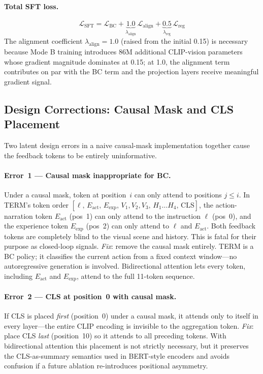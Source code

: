 \documentclass{article}
\begin{document}
\paragraph{Total SFT loss.}
\begin{equation}
  \mathcal{L}_{\mathrm{SFT}}
  = \mathcal{L}_{\mathrm{BC}}
  + \underbrace{1.0}_{\lambda_{\mathrm{align}}}\,\mathcal{L}_{\mathrm{align}}
  + \underbrace{0.5}_{\lambda_{\mathrm{reg}}}\,\mathcal{L}_{\mathrm{reg}}
  \label{eq:sft_loss}
\end{equation}
The alignment coefficient $\lambda_{\mathrm{align}}{=}1.0$ (raised from the
initial 0.15) is necessary because Mode B training introduces 86M additional
CLIP-vision parameters whose gradient magnitude dominates at 0.15; at 1.0,
the alignment term contributes on par with the BC term and the projection
layers receive meaningful gradient signal.

\subsection{Design Corrections: Causal Mask and CLS Placement}
\label{sec:bug}

Two latent design errors in a naive causal-mask implementation together
cause the feedback tokens to be entirely uninformative.

\paragraph{Error~1 — Causal mask inappropriate for BC.}
Under a causal mask, token at position~$i$ can only attend to
positions $j\!\le\!i$.
In TERM's token order
$[\ell,\,E_{\mathrm{act}},\,E_{\mathrm{exp}},\,V_1,V_2,V_3,\,H_1\ldots H_4,\,\mathrm{CLS}]$,
the action-narration token $E_{\mathrm{act}}$ (pos~1) can only attend to
the instruction $\ell$ (pos~0), and the experience token $E_{\mathrm{exp}}$
(pos~2) can only attend to $\ell$ and $E_{\mathrm{act}}$.
Both feedback tokens are completely blind to the visual scene and history.
This is fatal for their purpose as closed-loop signals.
\emph{Fix}: remove the causal mask entirely.
TERM is a BC policy; it classifies the current action from a fixed context
window---no autoregressive generation is involved.
Bidirectional attention lets every token, including $E_{\mathrm{act}}$ and
$E_{\mathrm{exp}}$, attend to the full 11-token sequence.

\paragraph{Error~2 — CLS at position~0 with causal mask.}
If CLS is placed \emph{first} (position~0) under a causal mask,
it attends only to itself in every layer---the entire CLIP encoding
is invisible to the aggregation token.
\emph{Fix}: place CLS \emph{last} (position~10) so it attends to all
preceding tokens.
With bidirectional attention this placement is not strictly necessary, but
it preserves the CLS-as-summary semantics used in BERT-style encoders and
avoids confusion if a future ablation re-introduces positional asymmetry.
\end{document}
